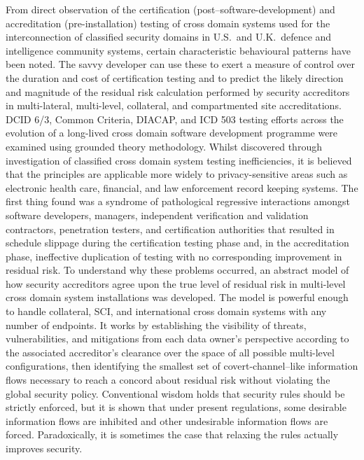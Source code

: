 From direct observation of the certification (post--software-development) and accreditation
(pre-installation) testing of cross domain systems used for the interconnection of classified
security domains in U.S.\ and U.K.\ defence and intelligence community systems, certain
characteristic behavioural patterns have been noted.  The savvy developer
can use these to exert a measure of control over the duration and cost of certification testing
and to predict the likely direction and magnitude of the residual risk calculation performed
by security accreditors in multi-lateral, multi-level, collateral, and compartmented site
accreditations.  DCID 6/3, Common Criteria, DIACAP, and ICD 503 testing efforts across the
evolution of a long-lived cross domain software development programme were examined using
grounded theory methodology.  Whilst discovered through investigation of classified cross
domain system testing inefficiencies, it is believed that the principles are applicable more
widely to privacy-sensitive areas such as electronic health care, financial, and law enforcement
record keeping systems.  The first thing found was a syndrome of pathological regressive
interactions amongst software developers, managers, independent verification and validation
contractors, penetration testers, and certification authorities that resulted in schedule
slippage during the certification testing phase and, in the accreditation phase, ineffective
duplication of testing with no corresponding improvement in residual risk.  To understand why
these problems occurred, an abstract model of how security accreditors agree upon the true
level of residual risk in multi-level cross domain system installations was developed.  The
model is powerful enough to handle collateral, SCI, and international cross domain systems
with any number of endpoints.  It works by establishing the visibility of threats,
vulnerabilities, and mitigations from each data owner's perspective according to the
associated accreditor's clearance over the space of all possible multi-level configurations,
then identifying the smallest set of covert-channel--like information flows necessary to
reach a concord about residual risk without violating the global security policy.  Conventional
wisdom holds that security rules should be strictly enforced, but it is shown that under present
regulations, some desirable information flows are inhibited and other undesirable information
flows are forced.  Paradoxically, it is sometimes the case that relaxing the rules actually
improves security.

